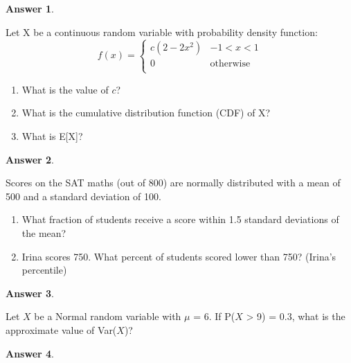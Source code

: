 \documentclass[12pt]{article}
\renewcommand{\(}{\left(}
\renewcommand{\)}{\right)}
\theoremstyle{definition}
\newtheorem*{answer}{Answer}
\begin{document}
\begin{enumerate}
{    \begin{shaded}
    \begin{answer}
    
    \end{answer}
    \end{shaded}
    \pagebreak
    \item Let X be a continuous random variable with probability density function:
    \[
    f(x) =
    \begin{cases} 
        c(2-2x^2) & -1 < x < 1 \\
        0 & \text{otherwise} \\
    \end{cases}
    \]
    \begin{enumerate}
        \item What is the value of $c$?
        \item What is the cumulative distribution function (CDF) of X?
        \item What is E[X]?
    \end{enumerate}
    
    \begin{shaded}
    \begin{answer}
    
    \end{answer}
    \end{shaded}
    \pagebreak
    \item Scores on the SAT maths (out of 800) are normally distributed with a mean of 500 and a standard deviation of 100.
    \begin{enumerate}
        \item What fraction of students receive a score within 1.5 standard deviations of the mean?
        \item Irina scores 750. What percent of students scored lower than 750? (Irina's percentile)
    \end{enumerate}
    
    \begin{shaded}
    \begin{answer}
    
    \end{answer}
    \end{shaded}
    \pagebreak
    \item Let $X$ be a Normal random variable with $\mu$ = 6. If P($X$ > 9) = 0.3, what is the approximate value of Var($X$)?
    
    \begin{shaded}
    \begin{answer}
    

\end{answer}
\end{shaded}}
\end{enumerate}
\end{document}
